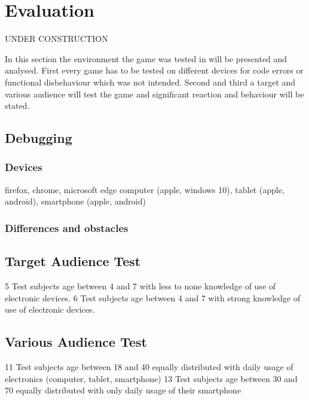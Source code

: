 
\chapter{Evaluation}
\label{chap:evaluation}
UNDER CONSTRUCTION

In this section the environment the game was tested in will be presented and analysed.
First every game has to be tested on different devices for code errors or functional disbehaviour which was not intended.
Second and third a target and various audience will test the game and significant reaction and behaviour will be stated.

\section{Debugging}
\subsection{Devices}
firefox, chrome, microsoft edge
computer (apple, windows 10), tablet (apple, android), smartphone (apple, android)
\subsection{Differences and obstacles}

\section{Target Audience Test}
5 Test subjects age between 4 and 7 with less to none knowledge of use of electronic devices.
6 Test subjects age between 4 and 7 with strong knowledge of use of electronic devices.

\section{Various Audience Test}
11 Test subjects age between 18 and 40 equally distributed with daily usage of electronics (computer, tablet, smartphone)
13 Test subjects age between 30 and 70 equally distributed with only daily usage of their smartphone


